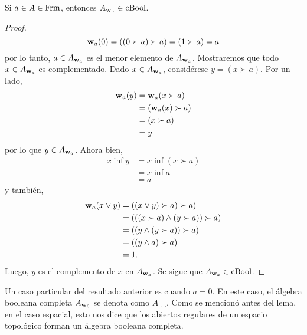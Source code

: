 \begin{lemma}
  \label{lemma:cocientes-w-bool}
  Si $a\in A \in \mathrm{Frm}$, entonces $A_{\mathbf w_{a}} \in \mathrm{cBool}$.
\end{lemma}
\begin{proof}
$$\mathbf w_{a} (0)=((0\succ a)\succ a)=(1\succ a)=a$$
por lo tanto, $a \in A_{\mathbf w_{a}}$ es el menor elemento de $A_{\mathbf w_{a}}$.
Mostraremos que todo $x\in A_{\mathbf w_{a}}$ es complementado.
Dado $x \in A_{\mathbf w_{a}}$, considérese $y=(x\succ a)$.
Por un lado, 
\begin{align*}
    \mathbf w_{a}(y) & =\mathbf w_{a}(x\succ a)\\
    &=(\mathbf w_{a}(x)\succ a)\\
    &=(x\succ a)\\
    &=y
\end{align*}
por lo que $y \in A_{\mathbf w_{a}}$. Ahora bien, 
\begin{align*}
    x\inf y&=x\inf(x\succ a)\\
    &=x\inf a\\
    &=a
\end{align*}
y también, 
\begin{align*}
    \mathbf w_{a}(x\vee y)&=((x\vee y)\succ a)\succ a)\\
    &=(((x\succ a)\wedge(y\succ a))\succ a)\\
    &=((y\wedge(y\succ a))\succ a)\\
    &=((y\wedge a)\succ a)\\
    &=1.
\end{align*}
Luego, $y$ es el complemento de $x$ en $A_{\mathbf w_{a}}$.
Se sigue que $A_{\mathbf w_{a}} \in \mathrm{cBool}$.
\end{proof}
Un caso particular del resultado anterior es cuando $a=0$.
En este caso, el álgebra booleana completa $A_{\mathbf w_{0}}$ se
denota como $A_{\neg \neg}$. Como se mencionó antes del lema,
en el caso espacial, esto nos dice que los abiertos regulares de
un espacio topológico forman un álgebra booleana completa.


